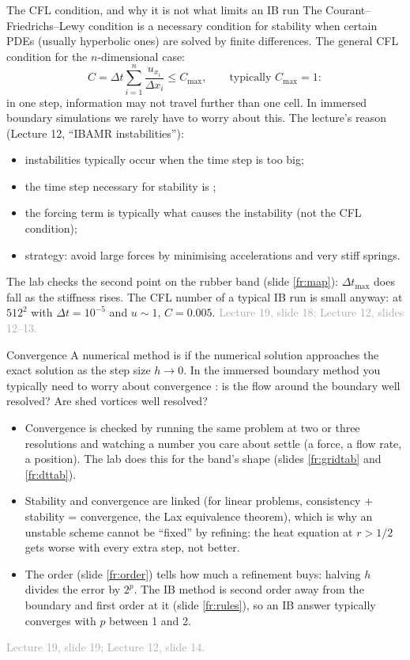\documentclass[aspectratio=169,11pt]{beamer}
\newcommand{\sourcecredit}[1]{\vfill\hfill{\tiny\textcolor{DarkGray}{#1}}}
\begin{document}
\begin{frame}{The CFL condition, and why it is not what limits an IB run}
\label{fr:cfl}
\small
The Courant--Friedrichs--Lewy condition is a necessary condition for stability when certain PDEs (usually hyperbolic ones) are solved by finite differences. The general CFL condition for the $n$-dimensional case:
\[ C = \Delta t \sum_{i=1}^{n} \frac{u_{x_i}}{\Delta x_i} \le C_{\max}, \qquad \text{typically } C_{\max} = 1 : \]
in one step, information may not travel further than one cell. In immersed boundary simulations we rarely have to worry about this. The lecture's reason (Lecture 12, ``IBAMR instabilities''):
\begin{itemize}
  \item instabilities typically occur when the time step is too big;
  \item the time step necessary for stability is ;
  \item the forcing term is typically what causes the instability (not the CFL condition);
  \item strategy: avoid large forces by minimising accelerations and very stiff springs.
\end{itemize}
The lab checks the second point on the rubber band (slide \ref{fr:map}): $\Delta t_{\max}$ does fall as the stiffness rises. The CFL number of a typical IB run is small anyway: at $512^2$ with $\Delta t = 10^{-5}$ and $u \sim 1$, $C = 0.005$.
\sourcecredit{Lecture 19, slide 18; Lecture 12, slides 12--13.}
\end{frame}

\begin{frame}{Convergence}
\label{fr:convergence}
\small
A numerical method is  if the numerical solution approaches the exact solution as the step size $h \to 0$. In the immersed boundary method you typically need to worry about convergence : is the flow around the boundary well resolved? Are shed vortices well resolved?
\begin{itemize}
  \item Convergence is checked by running the same problem at two or three resolutions and watching a number you care about settle (a force, a flow rate, a position). The lab does this for the band's shape (slides \ref{fr:gridtab} and \ref{fr:dttab}).
  \item Stability and convergence are linked (for linear problems, consistency + stability = convergence, the Lax equivalence theorem), which is why an unstable scheme cannot be ``fixed'' by refining: the heat equation at $r > 1/2$ gets worse with every extra step, not better.
  \item The order (slide \ref{fr:order}) tells how much a refinement buys: halving $h$ divides the error by $2^p$. The IB method is second order away from the boundary and first order at it (slide \ref{fr:rules}), so an IB answer typically converges with $p$ between 1 and 2.
\end{itemize}
\sourcecredit{Lecture 19, slide 19; Lecture 12, slide 14.}
\end{frame}
\end{document}
